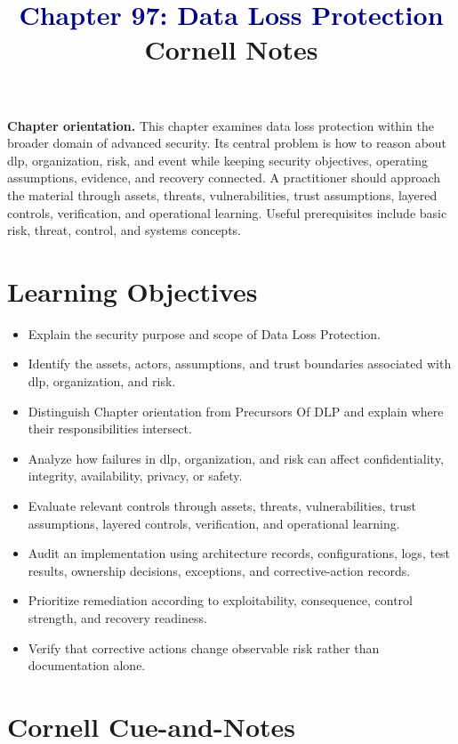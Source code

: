 \documentclass[11pt]{article}
\title{\textcolor{Navy}{Chapter 97: Data Loss Protection}\\[2mm]\large Cornell Notes}
\author{}
\date{}
\begin{document}
\maketitle
\thispagestyle{fancy}
\vspace{-1.5em}
\begin{orientationbox}
\textbf{Chapter orientation.} This chapter examines data loss protection within the broader domain of advanced security. Its central problem is how to reason about dlp, organization, risk, and event while keeping security objectives, operating assumptions, evidence, and recovery connected. A practitioner should approach the material through assets, threats, vulnerabilities, trust assumptions, layered controls, verification, and operational learning. Useful prerequisites include basic risk, threat, control, and systems concepts.
\end{orientationbox}
\section*{Learning Objectives}
\begin{itemize}
\item Explain the security purpose and scope of Data Loss Protection.
\item Identify the assets, actors, assumptions, and trust boundaries associated with dlp, organization, and risk.
\item Distinguish Chapter orientation from Precursors Of DLP and explain where their responsibilities intersect.
\item Analyze how failures in dlp, organization, and risk can affect confidentiality, integrity, availability, privacy, or safety.
\item Evaluate relevant controls through assets, threats, vulnerabilities, trust assumptions, layered controls, verification, and operational learning.
\item Audit an implementation using architecture records, configurations, logs, test results, ownership decisions, exceptions, and corrective-action records.
\item Prioritize remediation according to exploitability, consequence, control strength, and recovery readiness.
\item Verify that corrective actions change observable risk rather than documentation alone.
\end{itemize}
\section*{Cornell Cue-and-Notes}
\end{document}
